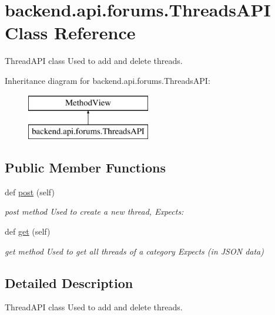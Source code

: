 \hypertarget{classbackend_1_1api_1_1forums_1_1_threads_a_p_i}{}\section{backend.\+api.\+forums.\+Threads\+A\+P\+I Class Reference}
\label{classbackend_1_1api_1_1forums_1_1_threads_a_p_i}


Thread\+A\+P\+I class Used to add and delete threads.  


Inheritance diagram for backend.\+api.\+forums.\+Threads\+A\+P\+I\+:\begin{figure}[H]
\begin{center}
\leavevmode
\includegraphics[height=2.000000cm]{classbackend_1_1api_1_1forums_1_1_threads_a_p_i}
\end{center}
\end{figure}
\subsection*{Public Member Functions}
\begin{DoxyCompactItemize}
\item 
def \hyperlink{classbackend_1_1api_1_1forums_1_1_threads_a_p_i_a2cba08a8b3d5ba09468a0e4bdc6d7757}{post} (self)
\begin{DoxyCompactList}\small\item\em post method Used to create a new thread, Expects\+: \end{DoxyCompactList}\item 
def \hyperlink{classbackend_1_1api_1_1forums_1_1_threads_a_p_i_a49775ef7e807eaec9e51f6f0ebf927e5}{get} (self)
\begin{DoxyCompactList}\small\item\em get method Used to get all threads of a category Expects (in J\+S\+O\+N data) \end{DoxyCompactList}\end{DoxyCompactItemize}


\subsection{Detailed Description}
Thread\+A\+P\+I class Used to add and delete threads. 

